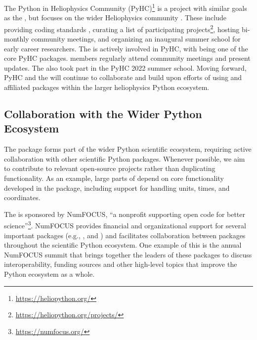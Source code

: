 The Python in Heliophysics Community (PyHC)\footnote{\url{https://heliopython.org/}} \citep{barnum2022python} is a project with similar goals as the \sunpyproj, but focuses on the wider Heliophysics community \citep{https://doi.org/10.1029/2018JA025877}.
These include providing coding standards \citep{annex_a_2018_2529131}, curating a list of participating projects\footnote{\url{https://heliopython.org/projects/}}, hosting bi-monthly community meetings, and organizing an inaugural summer school for early career researchers.
The \sunpyproj is actively involved in PyHC, with \sunpypkg being one of the core PyHC packages.
\sunpyproj members regularly attend community meetings and present updates.
The \sunpyproj also took part in the PyHC 2022 summer school.
Moving forward, PyHC and the \sunpyproj will continue to collaborate and build upon efforts of using \sunpypkg and affiliated packages within the larger heliophysics Python ecosystem.

\subsection{Collaboration with the Wider Python Ecosystem}
\label{ssec:collaboration-with-the-wider-python-ecosystem}

The \sunpypkg package forms part of the wider Python scientific ecosystem, requiring active collaboration with other scientific Python packages.
Whenever possible, we aim to contribute to relevant open-source projects rather than duplicating functionality.
As an example, large parts of \sunpypkg depend on core functionality developed in the \astropypkg package, including support for handling units, times, and coordinates.

The \sunpyproj is sponsored by NumFOCUS, \enquote{a nonprofit supporting open code for better science}\footnote{\url{https://numfocus.org/}}.
NumFOCUS provides financial and organizational support for several important packages (e.g., ,  and ) and facilitates collaboration between packages throughout the scientific Python ecosystem.
One example of this is the annual NumFOCUS summit that brings together the leaders of these packages to discuss interoperability, funding sources and other high-level topics that improve the Python ecosystem as a whole.


